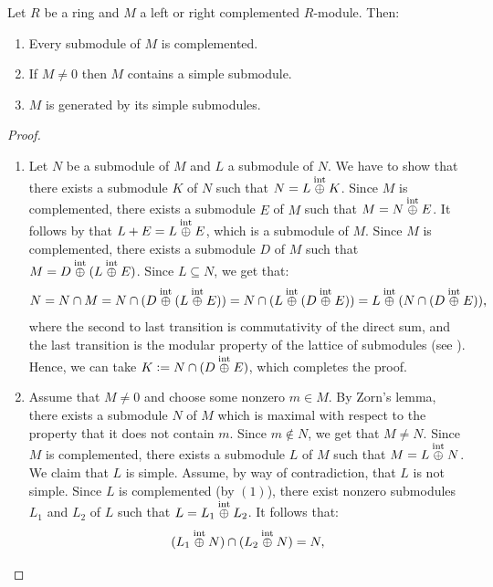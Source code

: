 \documentclass[11pt,a4paper]{article}
\begin{document}
\begin{proposition}
  \label{prop:properties-of-complemented-modules}
  Let $R$ be a ring and $M$ a left or right complemented $R$-module.
  Then:
  \begin{enumerate}
    \item[(1)] Every submodule of $M$ is complemented.
    \item[(2)] If $M \neq 0$ then $M$ contains a simple submodule.
    \item[(3)] $M$ is generated by its simple submodules.
  \end{enumerate}
\end{proposition}
\begin{proof} \phantom{}
  \begin{enumerate}
    \item[(1)] Let $N$ be a submodule of $M$ and $L$ a submodule of $N$.
      We have to show that there exists a submodule $K$ of $N$ such that
      $N = L \overset{\text{int}}{\oplus} K$.
      Since $M$ is complemented, there exists a submodule $E$ of $M$
      such that $M = N \overset{\text{int}}{\oplus} E$.
      It follows by  that $L + E = L \overset{\text{int}}{\oplus} E$,
      which is a submodule of $M$.
      Since $M$ is complemented, there exists a submodule $D$ of $M$
      such that $M = D \overset{\text{int}}{\oplus} (L \overset{\text{int}}{\oplus} E)$.
      Since $L \subseteq N$, we get that:
      \[
        N =
        N \cap M =
        N \cap (D \overset{\text{int}}{\oplus} (L \overset{\text{int}}{\oplus} E)) =
        N \cap (L \overset{\text{int}}{\oplus} (D \overset{\text{int}}{\oplus} E)) =
        L \overset{\text{int}}{\oplus} (N \cap (D \overset{\text{int}}{\oplus} E)),
      \]
      where the second to last transition is commutativity of the direct sum,
      and the last transition is the modular property of the lattice of submodules
      (see ).
      Hence, we can take $K := N \cap (D \overset{\text{int}}{\oplus} E)$,
      which completes the proof.
    \item[(2)] Assume that $M \neq 0$ and choose some nonzero $m \in M$.
      By Zorn's lemma, there exists a submodule $N$ of $M$ which is maximal
      with respect to the property that it does not contain $m$.
      Since $m \notin N$, we get that $M \neq N$.
      Since $M$ is complemented, there exists a submodule $L$ of $M$
      such that $M = L \overset{\text{int}}{\oplus} N$.
      We claim that $L$ is simple.
      Assume, by way of contradiction, that $L$ is not simple.
      Since $L$ is complemented (by $(1)$),
      there exist nonzero submodules $L_1$ and $L_2$ of $L$ such that
      $L = L_1 \overset{\text{int}}{\oplus} L_2$.
      It follows that:
      \[
        (L_1 \overset{\text{int}}{\oplus} N) \cap
        (L_2 \overset{\text{int}}{\oplus} N) = N,
\]
\end{enumerate}
\end{proof}
\end{document}
